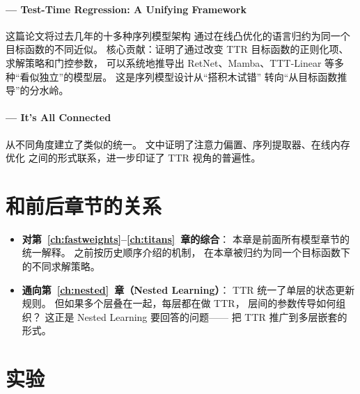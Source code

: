 \paragraph{\citet{taylor2025test} --- Test-Time Regression: A Unifying Framework}
这篇论文将过去几年的十多种序列模型架构
通过在线凸优化的语言归约为同一个目标函数的不同近似。
核心贡献：证明了通过改变 TTR 目标函数的正则化项、
求解策略和门控参数，
可以系统地推导出 RetNet、Mamba、TTT-Linear
等多种``看似独立''的模型层。
这是序列模型设计从``搭积木试错''
转向``从目标函数推导''的分水岭。

\paragraph{\citet{smith2025connected} --- It's All Connected}
从不同角度建立了类似的统一。
文中证明了注意力偏置、序列提取器、在线内存优化
之间的形式联系，进一步印证了 TTR 视角的普遍性。

\section{和前后章节的关系}
\label{sec:ttr_bridges}

\begin{itemize}
  \item \textbf{对第~\ref{ch:fastweights}--\ref{ch:titans}~章的综合}：
    本章是前面所有模型章节的统一解释。
    之前按历史顺序介绍的机制，
    在本章被归约为同一个目标函数下的不同求解策略。

  \item \textbf{通向第~\ref{ch:nested}~章（Nested Learning）}：
    TTR 统一了单层的状态更新规则。
    但如果多个层叠在一起，每层都在做 TTR，
    层间的参数传导如何组织？
    这正是 Nested Learning 要回答的问题——
    把 TTR 推广到多层嵌套的形式。
\end{itemize}

\section{实验}
\label{sec:ttr_lab}

